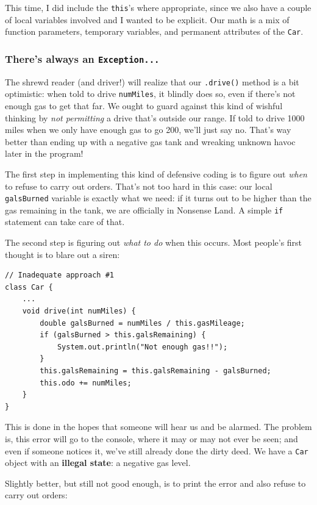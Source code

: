 This time, I did include the \texttt{this}'s where appropriate, since we also
have a couple of local variables involved and I wanted to be explicit. Our
math is a mix of function parameters, temporary variables, and permanent
attributes of the \texttt{Car}.

\subsubsection{There's always an \texttt{Exception...}}

The shrewd reader (and driver!) will realize that our \texttt{.drive()} method
is a bit optimistic: when told to drive \texttt{numMiles}, it blindly does so,
even if there's not enough gas to get that far. We ought to guard against this
kind of wishful thinking by \textit{not permitting} a drive that's outside our
range. If told to drive 1000 miles when we only have enough gas to go 200,
we'll just say no. That's way better than ending up with a negative gas tank
and wreaking unknown havoc later in the program!

The first step in implementing this kind of defensive coding is to figure out
\textit{when} to refuse to carry out orders. That's not too hard in this case:
our local \texttt{galsBurned} variable is exactly what we need: if it turns
out to be higher than the gas remaining in the tank, we are officially in
Nonsense Land. A simple \texttt{if} statement can take care of that.

The second step is figuring out \textit{what to do} when this occurs. Most
people's first thought is to blare out a siren:

\begin{Verbatim}[samepage=true,fontsize=\footnotesize,frame=single]
// Inadequate approach #1
class Car {
    ...
    void drive(int numMiles) {
        double galsBurned = numMiles / this.gasMileage;
        if (galsBurned > this.galsRemaining) {
            System.out.println("Not enough gas!!");
        }
        this.galsRemaining = this.galsRemaining - galsBurned;
        this.odo += numMiles;
    }
}
\end{Verbatim}

This is done in the hopes that someone will hear us and be alarmed. The
problem is, this error will go to the console, where it may or may not ever be
seen; and even if someone notices it, we've still already done the dirty deed.
We have a \texttt{Car} object with an \textbf{illegal state}: a negative gas
level.

Slightly better, but still not good enough, is to print the error and also
refuse to carry out orders:

